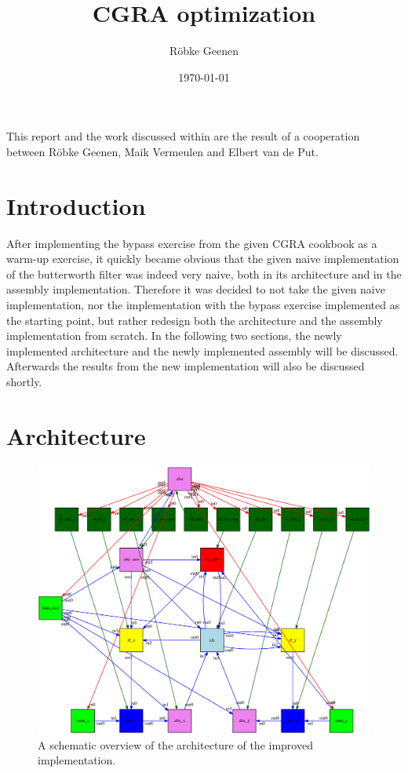 \documentclass[10pt,twocolumn]{article}
\title{\textbf{CGRA optimization}}
\author{R\"{o}bke Geenen}
\date{\today}
\begin{document}
\maketitle

This report and the work discussed within are the result of a
cooperation between R\"{o}bke Geenen, Maik Vermeulen and Elbert van de
Put.

\section{Introduction}
\label{sec:introduction}
After implementing the bypass exercise from the given CGRA cookbook as
a warm-up exercise, it quickly became obvious that the given naive
implementation of the butterworth filter was indeed very naive, both
in its architecture and in the assembly implementation. Therefore it
was decided to not take the given naive implementation, nor the
implementation with the bypass exercise implemented as the starting
point, but rather redesign both the architecture and the assembly
implementation from scratch. In the following two sections, the newly
implemented architecture and the newly implemented assembly will be
discussed. Afterwards the results from the new implementation will
also be discussed shortly.


\section{Architecture}
\label{sec:architecture}
\begin{figure}[ht]
  \centering
  \caption{A schematic overview of the architecture of the improved
    implementation.}
  \label{fig:architecture}
  \includegraphics[width=\linewidth]{architecture.eps}
\end{figure}
\end{document}
